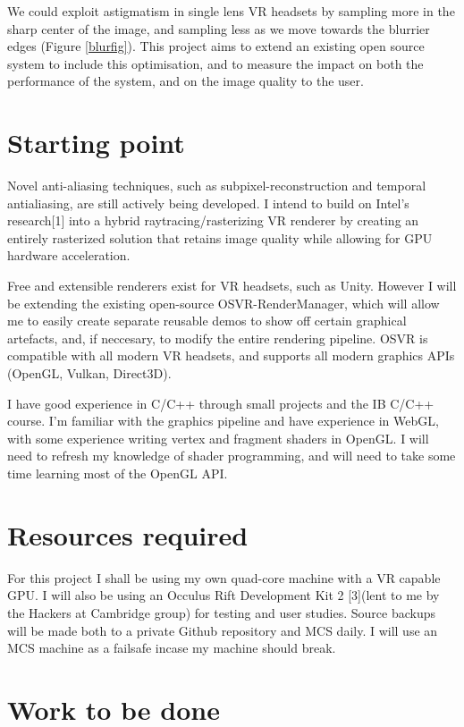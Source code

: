 \documentclass[12pt,a4paper,twoside]{article}
\begin{document}
We could exploit astigmatism in single lens VR headsets by sampling more in the sharp center of the image,
and sampling less as we move towards the blurrier edges (Figure \ref{blurfig}). This project aims to extend an existing open source system to include this optimisation, and to measure the impact on both the performance of the system, and on the image quality to the user.

\section*{Starting point}

Novel anti-aliasing techniques, such as subpixel-reconstruction and temporal antialiasing, are still actively being developed. I intend to build on Intel's research[1] into a hybrid raytracing/rasterizing VR renderer by creating an entirely rasterized solution that retains image quality while allowing for GPU hardware acceleration.

Free and extensible renderers exist for VR headsets, such as Unity. However I will be extending the existing open-source OSVR-RenderManager, which will allow me to easily create separate reusable demos to show off certain graphical artefacts, and, if neccesary, to modify the entire rendering pipeline.
OSVR is compatible with all modern VR headsets, and supports all modern graphics APIs (OpenGL, Vulkan, Direct3D).

I have good experience in C/C++ through small projects and the IB C/C++ course. I'm familiar with the graphics pipeline and have experience in WebGL, with some experience writing vertex and fragment shaders in OpenGL. I will need to refresh my knowledge of shader programming, and will need to take some time learning most of the OpenGL API.

\section*{Resources required}

For this project I shall be using my own quad-core machine with a VR capable GPU. I will also be using an Occulus Rift Development Kit 2 [3](lent to me by the Hackers at Cambridge group) for testing and user studies. Source backups will be made both to a private Github repository and MCS daily.
I will use an MCS machine as a failsafe incase my machine should break.

\section*{Work to be done}
\end{document}
